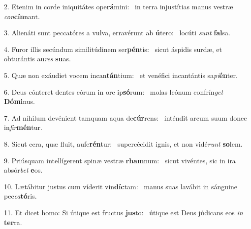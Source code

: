 2. Etenim in corde iniquitátes ope\textbf{rá}mini: \ast\  in terra injustítias manus vestræ \textit{con}\textbf{cín}nant.\

3. Alienáti sunt peccatóres a vulva, erravérunt ab \textbf{ú}tero: \ast\  locúti \textit{sunt} \textbf{fal}sa.\

4. Furor illis secúndum similitúdinem ser\textbf{pén}tis: \ast\  sicut áspidis surdæ, et obturántis au\textit{res} \textbf{su}as.\

5. Quæ non exáudiet vocem incan\textbf{tán}tium: \ast\  et venéfici incantántis sa\textit{pi}\textbf{én}ter.\

6. Deus cónteret dentes eórum in ore ip\textbf{só}rum: \ast\  molas leónum confrín\textit{get} \textbf{Dó}\textbf{mi}nus.\

7. Ad níhilum devénient tamquam aqua de\textbf{cúr}rens: \ast\  inténdit arcum suum donec in\textit{fir}\textbf{mén}tur.\

8. Sicut cera, quæ fluit, aufe\textbf{rén}tur: \ast\  supercécidit ignis, et non vidé\textit{runt} \textbf{so}lem.\

9. Priúsquam intellígerent spinæ vestræ \textbf{rham}num: \ast\  sicut vivéntes, sic in ira absór\textit{bet} \textbf{e}os.\

10. Lætábitur justus cum víderit vin\textbf{díc}tam: \ast\  manus suas lavábit in sánguine pec\textit{ca}\textbf{tó}ris.\

11. Et dicet homo: Si útique est fructus \textbf{jus}to: \ast\  útique est Deus júdicans eos \textit{in} \textbf{ter}ra.\


